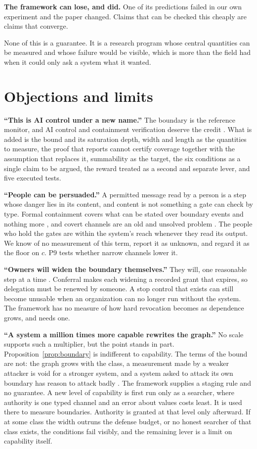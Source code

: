 \documentclass[10pt,twocolumn,letterpaper]{article}
\theoremstyle{definition}
\newcommand{\para}[1]{\smallskip\noindent\textbf{#1}\enspace}
\begin{document}
\para{The framework can lose, and did.} One of its predictions failed in our own experiment and the paper changed. Claims that can be checked this cheaply are claims that converge.

None of this is a guarantee. It is a research program whose central quantities can be measured and whose failure would be visible, which is more than the field had when it could only ask a system what it wanted.

\section{Objections and limits}
\label{sec:objections}

\para{``This is AI control under a new name.''} The boundary is the reference monitor, and AI control and containment verification deserve the credit \cite{control,moon}. What is added is the bound and its saturation depth, width and length as the quantities to measure, the proof that reports cannot certify coverage together with the assumption that replaces it, summability as the target, the six conditions as a single claim to be argued, the reward treated as a second and separate lever, and five executed tests.

\para{``People can be persuaded.''} A permitted message read by a person is a step whose danger lies in its content, and content is not something a gate can check by type. Formal containment covers what can be stated over boundary events and nothing more \cite{moon}, and covert channels are an old and unsolved problem \cite{lampson}. The people who hold the gates are within the system's reach whenever they read its output. We know of no measurement of this term, report it as unknown, and regard it as the floor on $c$. P9 tests whether narrow channels lower it.

\para{``Owners will widen the boundary themselves.''} They will, one reasonable step at a time \cite{kulveit}. Conferral makes each widening a recorded grant that expires, so delegation must be renewed by someone. A stop control that exists can still become unusable when an organization can no longer run without the system. The framework has no measure of how hard revocation becomes as dependence grows, and needs one.

\para{``A system a million times more capable rewrites the graph.''} No scale supports such a multiplier, but the point stands in part. Proposition~\ref{prop:boundary} is indifferent to capability. The terms of the bound are not: the graph grows with the class, a measurement made by a weaker attacker is void for a stronger system, and a system asked to attack its own boundary has reason to attack badly \cite{vanderweij}. The framework supplies a staging rule and no guarantee. A new level of capability is first run only as a searcher, where authority is one typed channel and an error about values costs least. It is used there to measure boundaries. Authority is granted at that level only afterward. If at some class the width outruns the defense budget, or no honest searcher of that class exists, the conditions fail visibly, and the remaining lever is a limit on capability itself.
\end{document}
